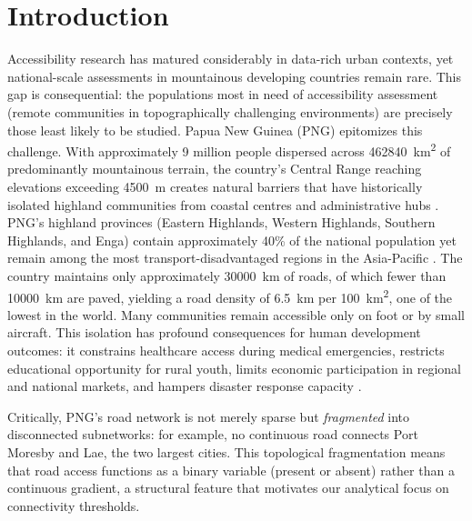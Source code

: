 \documentclass[review,3p,authoryear]{elsarticle}
\newcommand{\rev}[1]{\textcolor{red}{#1}}
\begin{document}
\linenumbers

\section{Introduction}
\label{sec:introduction}

Accessibility research has matured considerably in data-rich urban contexts, yet national-scale assessments in mountainous developing countries remain rare. This gap is consequential: the populations most in need of accessibility assessment (remote communities in topographically challenging environments) are precisely those least likely to be studied. Papua New Guinea (PNG) epitomizes this challenge. With approximately 9 million people dispersed across \SI{462840}{\kilo\metre\squared} of predominantly mountainous terrain, the country's Central Range reaching elevations exceeding \SI{4500}{\metre} creates natural barriers that have historically isolated highland communities from coastal centres and administrative hubs \citep{allen2017}. PNG's highland provinces (Eastern Highlands, Western Highlands, Southern Highlands, and Enga) contain approximately 40\% of the national population yet remain among the most transport-disadvantaged regions in the Asia-Pacific \citep{howes2018}. The country maintains only approximately \SI{30000}{\kilo\metre} of roads, of which fewer than \SI{10000}{\kilo\metre} are paved, yielding a road density of \SI{6.5}{\kilo\metre} per 100~\si{\kilo\metre\squared}, one of the lowest in the world\rev{\citep{adb2022}}. Many communities remain accessible only on foot or by small aircraft. This isolation has profound consequences for human development outcomes: it constrains healthcare access during medical emergencies, restricts educational opportunity for rural youth, limits economic participation in regional and national markets, and hampers disaster response capacity \citep{howes2018, worldbank2023png}.

Critically, PNG's road network is not merely sparse but \textit{fragmented} into disconnected subnetworks: for example, no continuous road connects Port Moresby and Lae, the two largest cities. This topological fragmentation means that road access functions as a binary variable (present or absent) rather than a continuous gradient, a structural feature that motivates our analytical focus on connectivity thresholds.
\end{document}
